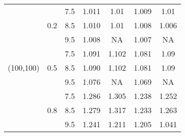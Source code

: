\documentclass[a4,11pt,epsf, amssymb]{article}
\begin{document}
\begin{table}[htbp]
\begin{tabular}{c|cccccc}
    \hline
    \multirow{9}[6]{*}{(100,100)} & \multirow{3}[2]{*}{0.2} & 7.5   & 1.011  & 1.01& 1.009 & 1.01 \\
          &       & 8.5   & 1.010  & 1.01 & 1.008 & 1.006 \\
          &       & 9.5   & 1.008  & NA    & 1.007 & NA\\
\cline{2-7}          & \multirow{3}[2]{*}{0.5} & 7.5   & 1.091  & 1.102 & 1.081 & 1.09\\
          &       & 8.5   & 1.090  & 1.102 & 1.081 & 1.09 \\
          &       & 9.5   & 1.076  & NA    & 1.069 & NA\\
\cline{2-7}          & \multirow{3}[2]{*}{0.8} & 7.5   & 1.286  & 1.305 & 1.238 & 1.252\\
          &       & 8.5   & 1.279  & 1.317 & 1.233 & 1.263 \\
          &       & 9.5   & 1.241  & 1.211 & 1.205 & 1.041\\
    \hline
    \end{tabular}%
  \label{tab:addlabel}%
\end{table}%
\end{document}
